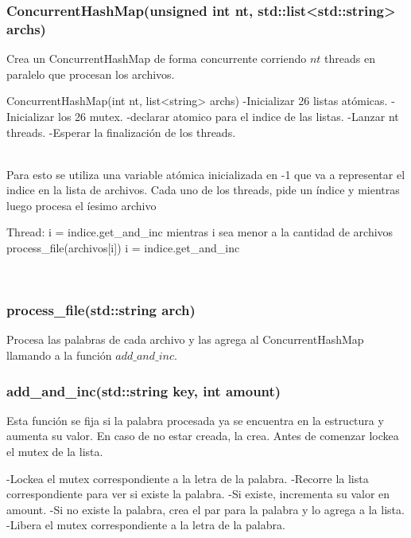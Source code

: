 \subsubsection{ConcurrentHashMap(unsigned int nt, std::list<std::string> archs)}
Crea un ConcurrentHashMap de forma concurrente corriendo $nt$ threads en paralelo que procesan los archivos.\\
\begin{codesnippet}
 ConcurrentHashMap(int nt, list<string> archs)
 	-Inicializar 26 listas atómicas.
 	-Inicializar los 26 mutex.
 	-declarar atomico para el indice de las listas.
 	-Lanzar nt threads.
 	-Esperar la finalización de los threads.
\end{codesnippet}\\
Para esto se utiliza una variable atómica inicializada en -1 que va a representar el indice en la lista de archivos.
Cada uno de los threads, pide un índice y mientras luego procesa el íesimo archivo\\
\begin{codesnippet}
 	Thread:
 		i = indice.get_and_inc
 		mientras i sea menor a la cantidad de archivos
 			process_file(archivos[i])
 			i = indice.get_and_inc
\end{codesnippet}\\

\subsubsection{process_file(std::string arch)}
Procesa las palabras de cada archivo y las agrega al ConcurrentHashMap llamando a la función $add\_and\_inc$.

\subsubsection{add_and_inc(std::string key, int amount)}
Esta función se fija si la palabra procesada ya se encuentra en la estructura y aumenta su valor. En caso de no estar creada, la crea. Antes de comenzar lockea el mutex de la lista.\\
\begin{codesnippet}
 	-Lockea el mutex correspondiente a la letra de la palabra.
 	-Recorre la lista correspondiente para ver si existe la palabra.
 	-Si existe, incrementa su valor en amount.
 	-Si no existe la palabra, crea el par para la palabra y lo agrega a la lista.
 	-Libera el mutex correspondiente a la letra de la palabra.
\end{codesnippet}\\

